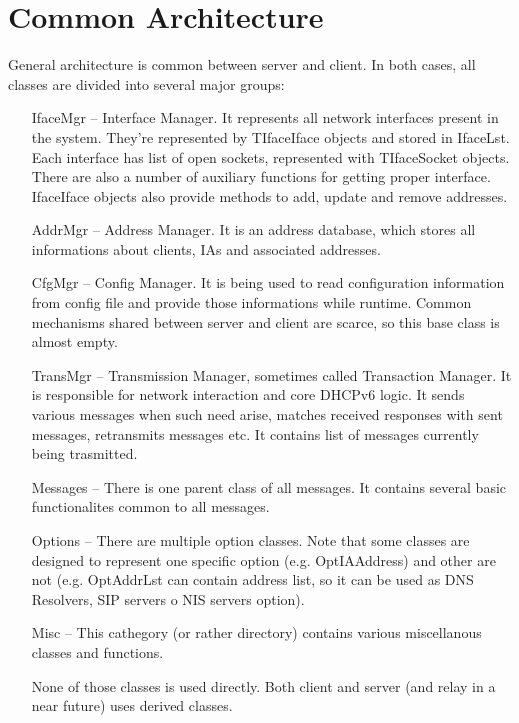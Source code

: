 
\section{Common Architecture}

General architecture is common between server and client. In both
cases, all classes are divided into several major groups:
\begin{itemize}
\item[IfaceMgr] -- Interface Manager. It represents all network interfaces present in the
  system. They're represented by TIfaceIface objects and stored in
  IfaceLst. Each interface has list of open sockets, represented with
  TIfaceSocket objects. There are also a number of auxiliary functions
  for getting proper interface. IfaceIface objects  also provide
  methods to add, update and remove addresses.
\item [AddrMgr] -- Address Manager. It is an address database, which
  stores all informations about clients, IAs and associated addresses.
\item [CfgMgr] -- Config Manager. It is being used to read
  configuration information from config file and provide those
  informations while runtime. Common mechanisms shared between server
  and client are scarce, so this base class is almost empty.
\item [TransMgr] -- Transmission Manager, sometimes called Transaction
  Manager. It is responsible for network interaction and core DHCPv6
  logic. It sends various messages when such need arise, matches received
  responses with sent messages, retransmits messages etc. It contains
  list of messages currently being trasmitted. 
\item[Messages] -- There is one parent class of all messages. It
  contains several basic functionalites common to all messages.
\item[Options] -- There are multiple option classes. Note that some
  classes are designed to represent one specific option
  (e.g. OptIAAddress) and other are not (e.g. OptAddrLst can contain
  address list, so it can be used as DNS Resolvers, SIP servers o NIS
  servers option). 
\item[Misc] -- This cathegory (or rather directory) contains various
  miscellanous classes and functions.

None of those classes is used directly. Both client and server (and
relay in a near future) uses derived classes.
\end{itemize}

